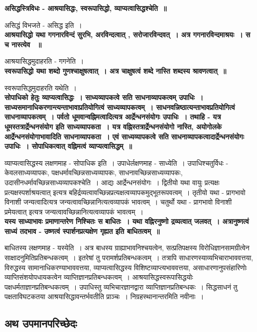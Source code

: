 	{\bfseries असिद्धस्त्रिविधः - आश्रयासिद्धः, स्वरूपासिद्धो, व्याप्यत्वासिद्धश्चेति~॥}\par
		असिद्धं विभजते - असिद्ध इति~।\\[10pt]
	{\bfseries आश्रयासिद्धो यथा गगनारविन्दं सुरभि, अरविन्दत्वात् , सरोजारविन्दवत्~। अत्र गगनारविन्दमाश्रयः~। स च नास्त्येव ~॥}\par
		आश्रयासिद्धमुदाहरति - गगनेति~।\\[10pt]
	{\bfseries स्वरूपासिद्धो यथा शब्दो गुणश्चाक्षुषत्वात्~। अत्र चाक्षुषत्वं शब्दे नास्ति शब्दस्य श्रावणत्वात्~॥}\par
		स्वरूपासिद्धमुदाहरति यथेति~।\\[10pt]
	{\bfseries सोपाधिको हेतुः व्याप्यत्वासिद्धः~। साध्यव्यापकत्वे सति साधनाव्यापकत्वम् उपाधिः~। साध्यसमानाधिकरणान्त्यन्ताभावाप्रतियोगित्वं साध्यव्यापकत्वम्~। साधनवन्निष्ठात्यन्ताभावप्रतियोगित्वं साधनाव्यापकत्वम्~। पर्वतो धूमवान्वह्निमत्वादित्यत्र आर्द्रेन्धनसंयोगः उपाधिः~। तथाहि - यत्र धूमस्तत्रार्द्रेन्धनसंयोग इति साध्यव्यापकता~। यत्र वह्निस्तत्रार्द्रेन्धनसंयोगो नास्ति, अयोगोलके आर्द्रेन्धनसंयोगाभावादिति साधनाव्यापकता~। एवं साध्यव्यापकत्वे सति साधनाव्यापकत्वादार्द्रेन्धनसंयोगः उपाधिः~। सोपाधिकत्वात् वह्निमत्वं व्याप्यत्वासिद्धम्~॥}\par
		व्याप्यत्वासिद्धस्य लक्षणमाह - सोपाधिक इति~। उपाधेर्लक्षणमाह - साध्येति~। उपाधिश्चतुर्विधः - केवलसाध्यव्यापकः, पक्षधर्मावच्छिन्नसाध्यव्यापकः, साधनावच्छिन्नसाध्यव्यापकः, उदासीनधर्मावच्छिन्नसाध्यव्यापकश्चेति~। आद्यः आर्द्रेन्धनसंयोगः~। द्वितीयो यथा वायुः प्रत्यक्षः प्रत्यक्षस्पर्शाश्रयत्वात् इत्यत्र बहिर्द्रव्यत्वावच्छिन्नप्रत्यक्षत्वव्यापकमुद्भूतरूपवत्वम्~। तृतीयो यथा - प्रागभावो विनाशी जन्यत्वादित्यत्र जन्यत्वावच्छिन्नानित्यत्वव्यापकं भावत्वम्~। चतुर्थो यथा - प्रागभावो विनाशी प्रमेयत्वात् इत्यत्र जन्यत्वावच्छिन्नानित्यत्वव्यापकं भावत्वम्~।\\[10pt]
	{\bfseries यस्य साध्याभावः प्रमाणान्तरेण निश्चितः स बाधितः~। यथा वह्निरनुष्णो द्रव्यत्वात् जलवत्~। अत्रानुष्णत्वं साध्यं तदभाव - उष्णत्वं स्पार्शनप्रत्यक्षेण गृह्यत इति बाधितत्वम्~॥}\par
		बाधितस्य लक्षणमाह - यस्येति~। अत्र बाधस्य ग्राह्याभावनिश्चयत्वेन, सत्प्रतिपक्षस्य विरोधिज्ञानसामग्रीत्वेन साक्षादनुमितिप्रतिबन्धकत्वम्~। इतरेषां तु परामर्शप्रतिबन्धकत्वम्~। तत्रापि साधारणस्याव्यभिचाराभाववत्तया, विरुद्धस्य सामानाधिकरण्याभाववत्तया, व्याप्यत्वासिद्धस्य विशिष्टव्याप्त्यभाववत्तया, असाधारणानुपसंहारिणोः व्याप्तिसंशयोपधायकत्वेन व्याप्तिज्ञानप्रतिबन्धकत्वम्~। आश्रयासिद्धस्वरूपासिद्धयोः पक्षधर्मताज्ञानप्रतिबन्धकत्वम्~। उपाधिस्तु व्यभिचारज्ञानद्वारा व्याप्तिज्ञानप्रतिबन्धकः~। सिद्धसाधनं तु पक्षताविघटकतया आश्रयासिद्धावन्तर्भवतीति प्राञ्चः~। निग्रहस्थानान्तरमिति नवीनाः~। \subsection*{अथ उपमानपरिच्छेदः}
